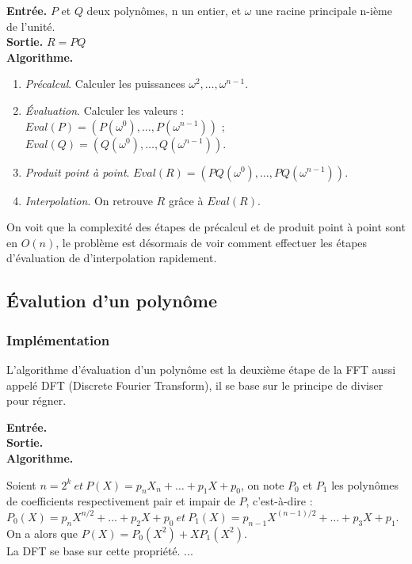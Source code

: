 \documentclass[12pt, a4paper]{article}
\begin{document}
\begin{tcolorbox}[colback=cyan!5!white,
                  colframe=cyan!100!black,
                  title=\textbf{Algorithme FFT}
                 ]
\textbf{Entrée.} $P$ et $Q$ deux polynômes, n un entier, et $\omega$ une racine principale n-ième de l’unité. \\
\textbf{Sortie.} $R = PQ$ \\
\textbf{Algorithme.}
\begin{enumerate}[itemsep=-2ex]
\item\textit{Précalcul}. Calculer les puissances $\omega^2,\dots,\omega^{n-1}$. \\
\item\textit{Évaluation}. Calculer les valeurs : \\ $Eval(P)=(P(\omega^0),\dots,P(\omega^{n-1}))$ ; $Eval(Q)=(Q(\omega^0),\dots,Q(\omega^{n-1}))$. \\
\item\textit{Produit point à point}. $Eval(R) = (PQ(\omega^0),\dots,PQ(\omega^{n-1}))$. \\
\item\textit{Interpolation}. On retrouve $R$ grâce à $Eval(R)$.
\end{enumerate}
\end{tcolorbox}
On voit que la complexité des étapes de précalcul et de produit point à point sont en $O(n)$, le problème est désormais de voir comment effectuer les étapes d'évaluation de d'interpolation rapidement.

\subsection{Évalution d'un polynôme}
\subsubsection{Implémentation}
L'algorithme d'évaluation d'un polynôme est la deuxième étape de la FFT aussi appelé DFT (Discrete Fourier Transform), il se base sur le principe de diviser pour régner. 

\begin{tcolorbox}[colback=cyan!5!white,
                  colframe=cyan!100!black,
                  title=\textbf{Algorithme DFT}
                 ]
\textbf{Entrée.} \\
\textbf{Sortie.} \\
\textbf{Algorithme.}
\end{tcolorbox}

Soient $n = 2^k\ et\ P(X) = p_n X_n +\dots+p_1 X + p_0$, on note $P_0$ et $P_1$ les polynômes de coefficients respectivement pair et impair de $P$, c'est-à-dire :\\
$P_0(X) = p_{n} X^{n/2} +\dots+ p_2 X + p_0\ et\ P_1(X) = p_{n-1} X^{(n-1)/2} +\dots+ p_3 X + p_1$. \\
On a alors que $P(X) = P_0(X^2)+X P_1(X^2)$. \\
La DFT se base sur cette propriété.
...
\end{document}
